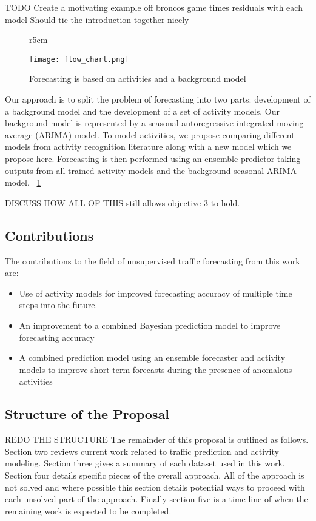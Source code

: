 TODO Create a motivating example off broncos game times residuals with each model
Should tie the introduction together nicely

\begin{figure}{r}{5cm}
	\begin{center}
		\texttt{[image: flow\_chart.png]}
	\end{center}
	\caption{Forecasting is based on activities and a background model}
	\label{fig:flow_chart}
\end{figure}

Our approach is to split the problem of forecasting into two parts: development of a background model and the development of a set of activity models.  Our background model is represented by a seasonal autoregressive integrated moving average (ARIMA) model.  To model activities, we propose comparing different models from activity recognition literature along with a new model which we propose here.  Forecasting is then performed using an ensemble predictor taking outputs from all trained activity models and the background seasonal ARIMA model. ~\ref{fig:flow_chart}

DISCUSS HOW ALL OF THIS still allows objective 3 to hold.


\subsection{Contributions}  
The contributions to the field of unsupervised traffic forecasting from this work are:
\begin{itemize}
\item{Use of activity models for improved forecasting accuracy of multiple time steps into the future.}
\item{An improvement to a combined Bayesian prediction model to improve forecasting accuracy}
\item{A combined prediction model using an ensemble forecaster and activity models to improve short term forecasts during the presence of anomalous activities}
\end{itemize}

\subsection{Structure of the Proposal}
REDO THE STRUCTURE
The remainder of this proposal is outlined as follows.  Section two reviews current work related to traffic prediction and activity modeling.  Section three gives a summary of each dataset used in this work.  Section four details specific pieces of the overall approach.  All of the approach is not solved and where possible this section details potential ways to proceed with each unsolved part of the approach.  Finally section five is a time line of when the remaining work is expected to be completed.

